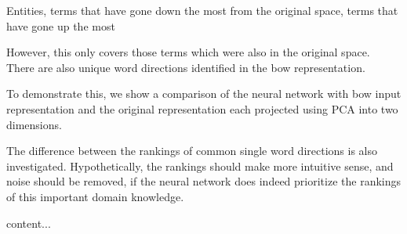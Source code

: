 
\begin{table}[]\label{Unique word directions identified in the bow representation}
	Entities, terms that have gone down the most from the original space, terms that have gone up the most
\end{table}

However, this only covers those terms which were also in the original space. There are also unique word directions identified in the bow representation. %


To demonstrate this, we show a comparison of the neural network with bow input representation and the original representation each projected using PCA into two dimensions.


The difference between the rankings of common single word directions is also investigated. Hypothetically, the rankings should make more intuitive sense, and noise should be removed, if the neural network does indeed prioritize the rankings of this important domain knowledge.






\begin{table}[]\label{For movies Top directions +}
	content...
\end{table}
 
